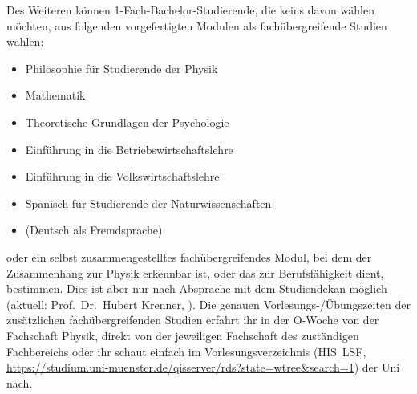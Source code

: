 {\small
Des Weiteren können 1-Fach-Bachelor-Studierende, die keins davon wählen möchten, aus folgenden vorgefertigten Modulen als fachübergreifende Studien wählen:
\begin{itemize}[nosep]
	\item Philosophie für Studierende der Physik
	\item Mathematik
	\item Theoretische Grundlagen der Psychologie
	\item Einführung in die Betriebswirtschaftslehre
	\item Einführung in die Volkswirtschaftslehre
	\item Spanisch für Studierende der Naturwissenschaften
	\item (Deutsch als Fremdsprache)
\end{itemize}
oder ein selbst zusammengestelltes fachübergreifendes Modul, bei dem der Zusammenhang zur Physik erkennbar ist, oder das zur Berufsfähigkeit dient, bestimmen.
Dies ist aber nur nach Absprache mit dem Studiendekan möglich (aktuell: Prof.\ Dr.\ Hubert Krenner, ).
Die genauen Vorlesungs-/Übungszeiten der zusätzlichen fachübergreifenden Studien erfahrt ihr in der O-Woche von der Fachschaft Physik, direkt von der jeweiligen Fachschaft des zuständigen Fachbereichs oder ihr schaut einfach im Vorlesungsverzeichnis (HIS~LSF, \url{https://studium.uni-muenster.de/qisserver/rds?state=wtree&search=1}) der Uni nach.
}
